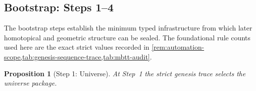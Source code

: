 \documentclass[11pt,a4paper]{article}
\theoremstyle{plain}
\newtheorem{proposition}[theorem]{Proposition}
\theoremstyle{definition}
\theoremstyle{remark}
\begin{document}
\subsection{Bootstrap: Steps 1--4}
\label{subsec:genesis-bootstrap-proof}

The bootstrap steps establish the minimum typed infrastructure from which later
homotopical and geometric structure can be sealed.
The foundational rule counts used here are the exact strict values recorded in
\cref{rem:automation-scope,tab:genesis-sequence-trace,tab:mbtt-audit}.

\begin{proposition}[Step 1: Universe]
\label{prop:genesis-step1}
At Step~1 the strict genesis trace selects the universe package.
\end{proposition}
\end{document}
